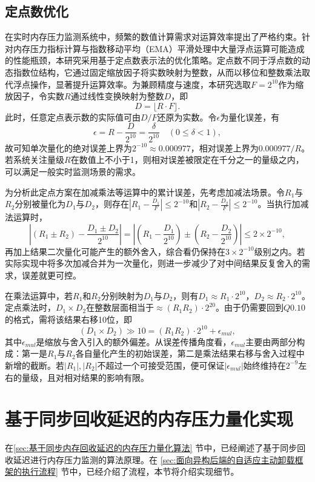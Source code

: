 \subsection{定点数优化}
\label{sec:fixed_point_optimization}

在实时内存压力监测系统中，频繁的数值计算需求对运算效率提出了严格约束。针对内存压力指标计算与指数移动平均（EMA）平滑处理中大量浮点运算可能造成的性能瓶颈，本研究采用基于定点数表示法的优化策略。定点数不同于浮点数的动态指数位结构，它通过固定缩放因子将实数映射为整数，从而以移位和整数乘法取代浮点操作，显著提升运算效率。为兼顾精度与速度，本研究选取\(F=2^{10}\)作为缩放因子，令实数\(R\)通过线性变换映射为整数\(D\)，即
\[
D = \lfloor R \cdot F \rfloor.
\]
此时，任意定点表示数的实际值可由\(D / F\)还原为实数。令\(\epsilon\)为量化误差，有
\[
\epsilon = R - \frac{D}{2^{10}} = \frac{\delta}{2^{10}} \quad (0 \leq \delta < 1),
\]
故可知单次量化的绝对误差上界为\(2^{-10}\approx 0.000977\)，相对误差上界为\(0.000977 / R\)。若系统关注量级\(R\)在数值上不小于1，则相对误差被限定在千分之一的量级之内，可以满足一般实时监测场景的需求。

为分析此定点方案在加减乘法等运算中的累计误差，先考虑加减法场景。令\(R_1\)与\(R_2\)分别被量化为\(D_1\)与\(D_2\)，则存在\(|R_1 - \frac{D_1}{F}| \le 2^{-10}\)和\(|R_2 - \frac{D_2}{F}| \le 2^{-10}\)。当执行加减法运算时，
\[
\left| (R_1 \pm R_2) - \frac{D_1 \pm D_2}{2^{10}} \right|
= \left| (R_1 - \frac{D_1}{2^{10}}) \pm (R_2 - \frac{D_2}{2^{10}}) \right|
\le 2 \times 2^{-10},
\]
再加上结果二次量化可能产生的额外舍入，综合看仍保持在\(3 \times 2^{-10}\)级别之内。若实际实现中将多次加减合并为一次量化，则进一步减少了对中间结果反复舍入的需求，误差就更可控。

在乘法运算中，若\(R_1\)和\(R_2\)分别映射为\(D_1\)与\(D_2\)，则有\(D_1 \approx R_1 \cdot 2^{10}\)，\(D_2 \approx R_2 \cdot 2^{10}\)。定点乘法时，\(D_1 \times D_2\)在整数层面相当于\(\approx (R_1 R_2)\cdot 2^{20}\)。由于仍需要回到\(Q0.10\)的格式，需将该结果右移10位，即
\[
(D_1 \times D_2) \gg 10 = (R_1 R_2)\cdot 2^{10} + \epsilon_{mul},
\]
其中\(\epsilon_{mul}\)是缩放与舍入引入的额外偏差。从误差传播角度看，\(\epsilon_{mul}\)主要由两部分构成：第一是\(R_1\)与\(R_2\)各自量化产生的初始误差，第二是乘法结果右移与舍入过程中新增的截断。若\(|R_1|, |R_2|\)不超过一个可接受范围，便可保证\(|\epsilon_{mul}|\)始终维持在\(2^{-9}\)左右的量级，且对相对结果的影响有限。

\section{基于同步回收延迟的内存压力量化实现}
\label{sec:基于同步回收延迟的内存压力量化实现}
在\ref{sec:基于同步内存回收延迟的内存压力量化算法} 节中，已经阐述了基于同步回收延迟进行内存压力监测的算法原理。在 \ref{sec:面向异构后端的自适应主动卸载框架的执行流程} 节中，已经介绍了流程，本节将介绍实现细节。

